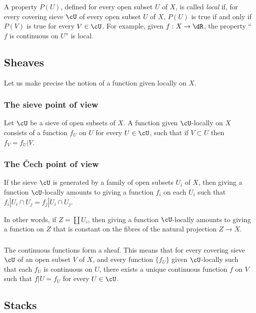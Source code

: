 A property $P(U)$, defined for every open subset $U$ of $X$, is called
\emph{local} if, for every covering sieve $\cU$ of every open subset $U$
of $X$, $P(U)$ is true if and only if $P(V)$ is true for every
$V\in \cU$. For example, given $f:X\to \dR$, the property “$f$ is
continuous on $U$” is local.

\subsection{Sheaves}\label{I:1-2}

Let us make precise the notion of a function given locally on $X$.

\subsubsection{The sieve point of view}\label{I:1-2-1}

Let $\cU$ be a sieve of open subsets of $X$. A function given
$\cU$-locally on $X$ consists of a function $f_U$ on $U$ for every
$U\in \cU$, such that if $V\subset U$ then $f_V=f_U|V$.

\subsubsection{The Čech point of view}\label{I:1-2-2}

If the sieve $\cU$ is generated by a family of open subsets $U_i$ of $X$,
then giving a function $\cU$-locally amounts to giving a function $f_i$
on each $U_i$ such that
$f_i|{U_i\cap U_j} = f_j|{U_i\cap U_j}$.

In other words, if $Z=\coprod U_i$, then giving a function
$\cU$-locally amounts to giving a function on $Z$ that is constant on the
fibres of the natural projection $Z\to X$.

\subsubsection{}\label{I:1-2-3}

The continuous functions form a sheaf. This means that for every covering
sieve $\cU$ of an open subset $V$ of $X$, and every function
$\{f_U\}$ given $\cU$-locally such that each $f_U$ is continuous on
$U$, there exists a unique continuous function $f$ on $V$ such that
$f|U=f_U$ for every $U\in \cU$.

\subsection{Stacks}\label{I:1-3}

